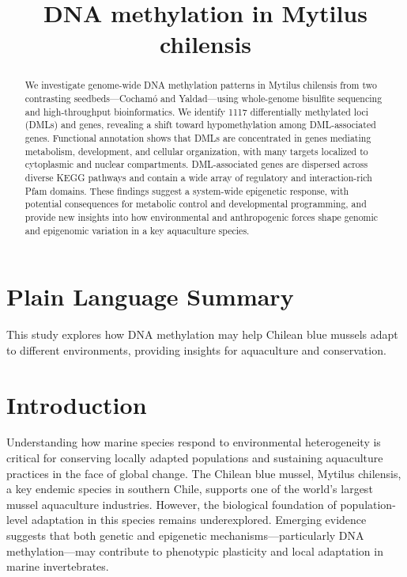 \documentclass[
]{agujournal2019}
\begin{document}
\title{DNA methylation in Mytilus chilensis}



\begin{abstract}
We investigate genome-wide DNA methylation patterns in Mytilus chilensis
from two contrasting seedbeds---Cochamó and Yaldad---using whole-genome
bisulfite sequencing and high-throughput bioinformatics. We identify
1117 differentially methylated loci (DMLs) and genes, revealing a shift
toward hypomethylation among DML-associated genes. Functional annotation
shows that DMLs are concentrated in genes mediating metabolism,
development, and cellular organization, with many targets localized to
cytoplasmic and nuclear compartments. DML-associated genes are dispersed
across diverse KEGG pathways and contain a wide array of regulatory and
interaction-rich Pfam domains. These findings suggest a system-wide
epigenetic response, with potential consequences for metabolic control
and developmental programming, and provide new insights into how
environmental and anthropogenic forces shape genomic and epigenomic
variation in a key aquaculture species.
\end{abstract}

\section*{Plain Language Summary}
This study explores how DNA methylation may help Chilean blue mussels
adapt to different environments, providing insights for aquaculture and
conservation.




\section{Introduction}\label{introduction}

Understanding how marine species respond to environmental heterogeneity
is critical for conserving locally adapted populations and sustaining
aquaculture practices in the face of global change. The Chilean blue
mussel, Mytilus chilensis, a key endemic species in southern Chile,
supports one of the world's largest mussel aquaculture industries.
However, the biological foundation of population-level adaptation in
this species remains underexplored. Emerging evidence suggests that both
genetic and epigenetic mechanisms---particularly DNA methylation---may
contribute to phenotypic plasticity and local adaptation in marine
invertebrates.
\end{document}
